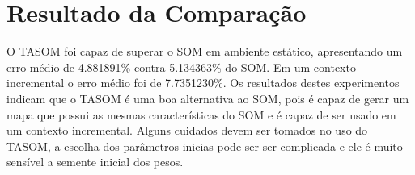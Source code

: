 \section{Resultado da Comparação}
O TASOM foi capaz de superar o SOM em ambiente estático, apresentando um erro médio de 4.881891\% contra 5.134363\% do SOM. Em um contexto incremental o erro médio foi de 7.7351230\%. Os resultados destes experimentos indicam que o TASOM é uma boa alternativa ao SOM, pois é capaz de gerar um mapa que possui as mesmas características do SOM e é capaz de ser usado em um contexto incremental. Alguns cuidados devem ser tomados no uso do TASOM, a escolha dos parâmetros inicias pode ser ser complicada e ele é muito sensível a semente inicial dos pesos.


























